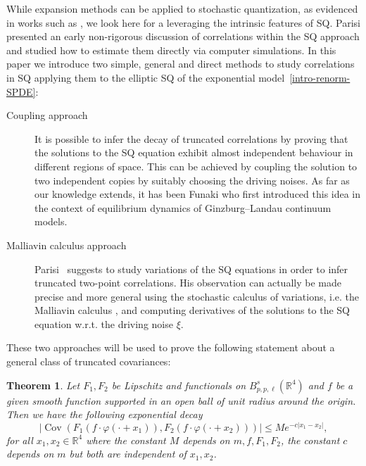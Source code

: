 \documentclass{article}
\newcommand{\tmop}[1]{\ensuremath{\operatorname{#1}}}
\newcommand{\tmtextit}[1]{\text{{\itshape{#1}}}}
\newtheorem{theorem}{Theorem}
\begin{document}
While expansion methods can be applied to stochastic quantization, as evidenced in works such as {\cite{D90,JLS96}}, we look here for a \tmtextit{stochastic analytic approach} leveraging the intrinsic features of SQ. Parisi {\cite{P81}} presented an early non-rigorous discussion of correlations within the SQ approach and studied how to estimate them directly via computer simulations. In this paper we introduce two simple, general and direct methods to study correlations in SQ applying them to the elliptic SQ of the exponential model~\eqref{intro-renorm-SPDE}:
%
\begin{description}
  \item[Coupling approach] It is possible to infer the decay of truncated
  correlations by proving that the solutions to the SQ equation exhibit almost  independent behaviour in different regions of space. This can be achieved by coupling the solution to two independent copies by suitably choosing the driving noises. As far as our knowledge extends, it has been Funaki {\cite{funakiReversibleMeasuresMultidimensional1991}} who first
  introduced this idea in the context of equilibrium dynamics of
  Ginzburg--Landau continuum models.
  
  \item[Malliavin calculus approach] Parisi~{\cite{P81}} suggests to study
  variations of the SQ equations in order to infer truncated two-point
  correlations. His observation can actually be made precise and more general using the stochastic calculus of variations, i.e. the Malliavin
  calculus {\cite{Nualart2006}}, and computing derivatives of the solutions to  the SQ equation w.r.t. the driving noise $\xi$.
\end{description}
These two approaches will be used to prove the following statement about a
general class of truncated covariances:

\begin{theorem}
  \label{thm-main}Let $F_1, F_2$ be Lipschitz and functionals on $B_{p, p, \ell}^s (\mathbb{R}^4)$ and $f$ be a given smooth
  function supported in an open ball of unit radius around the origin. Then we  have the following exponential decay
  \begin{equation}
    | \tmop{Cov} (F_1 (f \cdot \varphi (\cdot + x_1)), F_2 (f \cdot \varphi
    (\cdot + x_2))) | \leqslant M  e^{- c | x_1 - x_2 |}, \label{corrDecay}
  \end{equation}
  for all $x_1, x_2 \in \mathbb{R}^4$ where the constant $M$ depends on $m, f, F_1, F_2$, the constant $c$ depends on $m$ but both are independent of $x_1, x_2$.
\end{theorem}
\end{document}
